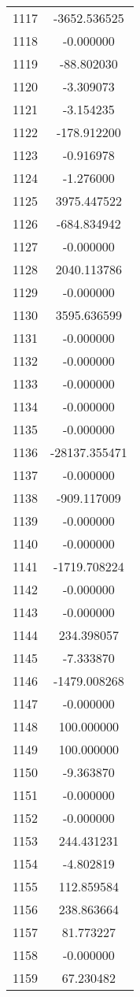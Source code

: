 \documentclass[12pt]{article}
\begin{document}
\begin{longtable}{@{}cc@{}}
1117 & -3652.536525 \\
1118 & -0.000000 \\
1119 & -88.802030 \\
1120 & -3.309073 \\
1121 & -3.154235 \\
1122 & -178.912200 \\
1123 & -0.916978 \\
1124 & -1.276000 \\
1125 & 3975.447522 \\
1126 & -684.834942 \\
1127 & -0.000000 \\
1128 & 2040.113786 \\
1129 & -0.000000 \\
1130 & 3595.636599 \\
1131 & -0.000000 \\
1132 & -0.000000 \\
1133 & -0.000000 \\
1134 & -0.000000 \\
1135 & -0.000000 \\
1136 & -28137.355471 \\
1137 & -0.000000 \\
1138 & -909.117009 \\
1139 & -0.000000 \\
1140 & -0.000000 \\
1141 & -1719.708224 \\
1142 & -0.000000 \\
1143 & -0.000000 \\
1144 & 234.398057 \\
1145 & -7.333870 \\
1146 & -1479.008268 \\
1147 & -0.000000 \\
1148 & 100.000000 \\
1149 & 100.000000 \\
1150 & -9.363870 \\
1151 & -0.000000 \\
1152 & -0.000000 \\
1153 & 244.431231 \\
1154 & -4.802819 \\
1155 & 112.859584 \\
1156 & 238.863664 \\
1157 & 81.773227 \\
1158 & -0.000000 \\
1159 & 67.230482 \\

\end{longtable}
\end{document}
